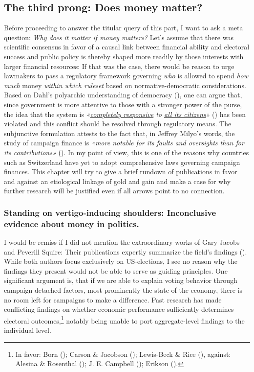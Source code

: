 \documentclass[11pt,a4paper]{article}
\begin{document}
\subsection{The third prong: Does money matter?}
Before proceeding to answer the titular query of this part, I want to ask a meta question: \textit{Why does it matter if money matters?} Let’s assume that there was scientific consensus in favor of a causal link between financial ability and electoral success and public policy is thereby shaped more readily by those interests with larger financial resources: If that was the case, there would be reason to urge lawmakers to pass a regulatory framework governing \textit{who} is allowed to spend \textit{how much} money \textit{within which ruleset} based on normative-democratic considerations. Based on Dahl's polyarchic understanding of democracy (\cite{dahl_democracy_1989}), one can argue that, since government is more attentive to those with a stronger power of the purse, the idea that the system is \textit{«\underline{completely responsive} to \underline{all its citizens}»} (\cite{goertz_social_2006}) has been violated and this conflict should be resolved through regulatory means. The subjunctive formulation attests to the fact that, in Jeffrey Milyo’s words, the study of campaign finance is \textit{«more notable for its faults and oversights than for its contributions»} (\cite{milyo_political_1999}). In my point of view, this is one of the reasons why countries such as Switzerland have yet to adopt comprehensive laws governing campaign finances. This chapter will try to give a brief rundown of publications in favor and against an etiological linkage of gold and gain and make a case for why further research will be justified even if all arrows point to no connection.

\subsubsection{Standing on vertigo-inducing shoulders: Inconclusive evidence about money in politics.}
I would be remiss if I did not mention the extraordinary works of Gary Jacobs and Peverill Squire: Their publications expertly summarize the field’s findings (\cite{jacobson_money_1985,squire_candidates_1995}). While both authors focus exclusively on US-elections, I see no reason why the findings they present would not be able to serve as guiding principles. One significant argument is, that if we are able to explain voting behavior through campaign-detached factors, most prominently the state of the economy, there is no room left for campaigns to make a difference. Past research has made conflicting findings on whether economic performance sufficiently determines electoral outcomes,\footnote{In favor: Born (\citeyear{born_strategic_1986}); Carson \& Jacobson (\citeyear{carson_politics_2024}); Lewis-Beck \& Rice (\citeyear{lewis-beck_forecasting_1992}), against: Alesina \& Rosenthal (\citeyear{alesina_partisan_1989}); J. E. Campbell (\citeyear{campbell_presidential_1997}); Erikson (\citeyear{erikson_economic_1990}).} notably being unable to port aggregate-level findings to the individual level.
\end{document}
